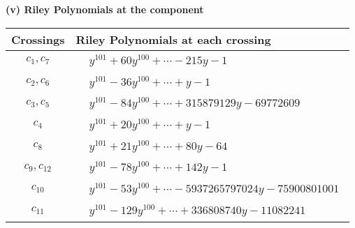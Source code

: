 \documentclass[1p]{elsarticle_modified}
\theoremstyle{definition}
\begin{document}
\newpage\renewcommand{\arraystretch}{1}
\flushleft \textbf{(v) Riley Polynomials at the component}\newline \\
\begin{tabular}{m{50pt}|m{274pt}}
Crossings & \hspace{64pt}Riley Polynomials at each crossing \\
\hline $$\begin{aligned}c_{1},c_{7}\end{aligned}$$&$\begin{aligned}
&y^{101}+60 y^{100}+\cdots-215 y-1
\end{aligned}$\\
\hline $$\begin{aligned}c_{2},c_{6}\end{aligned}$$&$\begin{aligned}
&y^{101}-36 y^{100}+\cdots+y-1
\end{aligned}$\\
\hline $$\begin{aligned}c_{3},c_{5}\end{aligned}$$&$\begin{aligned}
&y^{101}-84 y^{100}+\cdots+315879129 y-69772609
\end{aligned}$\\
\hline $$\begin{aligned}c_{4}\end{aligned}$$&$\begin{aligned}
&y^{101}+20 y^{100}+\cdots+y-1
\end{aligned}$\\
\hline $$\begin{aligned}c_{8}\end{aligned}$$&$\begin{aligned}
&y^{101}+21 y^{100}+\cdots+80 y-64
\end{aligned}$\\
\hline $$\begin{aligned}c_{9},c_{12}\end{aligned}$$&$\begin{aligned}
&y^{101}-78 y^{100}+\cdots+142 y-1
\end{aligned}$\\
\hline $$\begin{aligned}c_{10}\end{aligned}$$&$\begin{aligned}
&y^{101}-53 y^{100}+\cdots-5937265797024 y-75900801001
\end{aligned}$\\
\hline $$\begin{aligned}c_{11}\end{aligned}$$&$\begin{aligned}
&y^{101}-129 y^{100}+\cdots+336808740 y-11082241
\end{aligned}$\\
\hline
\end{tabular}\\~\\
\end{document}
